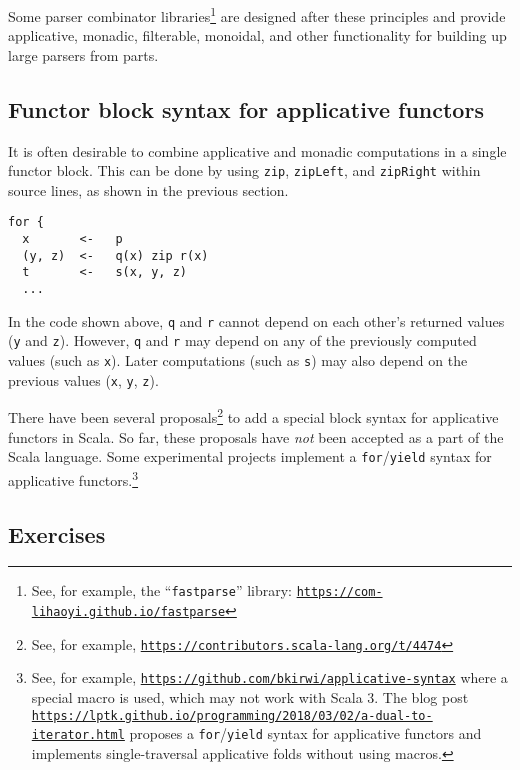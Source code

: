 Some parser combinator libraries\footnote{See, for example, the \textsf{``}\texttt{fastparse}\textsf{''} library: \texttt{\href{https://com-lihaoyi.github.io/fastparse}{https://com-lihaoyi.github.io/fastparse}}}
are designed after these principles and provide applicative, monadic,
filterable, monoidal, and other functionality for building up large
parsers from parts.

\subsection{Functor block syntax for applicative functors}

It is often desirable to combine applicative and monadic computations
in a single functor block. This can be done by using \lstinline!zip!,
\lstinline!zipLeft!, and \lstinline!zipRight! within source lines,
as shown in the previous section.
\begin{lstlisting}
for {
  x       <-   p
  (y, z)  <-   q(x) zip r(x)
  t       <-   s(x, y, z)
  ...
\end{lstlisting}
In the code shown above, \lstinline!q! and \lstinline!r! cannot
depend on each other\textsf{'}s returned values (\lstinline!y! and \lstinline!z!).
However, \lstinline!q! and \lstinline!r! may depend on any of the
previously computed values (such as \lstinline!x!). Later computations
(such as \lstinline!s!) may also depend on the previous values (\lstinline!x!,
\lstinline!y!, \lstinline!z!).

There have been several proposals\footnote{See, for example, \texttt{\href{https://contributors.scala-lang.org/t/4474}{https://contributors.scala-lang.org/t/4474}}}
to add a special block syntax for applicative functors in Scala. So
far, these proposals have \emph{not} been accepted as a part of the
Scala language. Some experimental projects implement a \lstinline!for!/\lstinline!yield!
syntax for applicative functors.\footnote{See, for example, \texttt{\href{https://github.com/bkirwi/applicative-syntax}{https://github.com/bkirwi/applicative-syntax}}
where a special macro is used, which may not work with Scala 3. The
blog post \texttt{\href{https://lptk.github.io/programming/2018/03/02/a-dual-to-iterator.html}{https://lptk.github.io/programming/2018/03/02/a-dual-to-iterator.html}}
proposes a \lstinline!for!/\lstinline!yield! syntax for applicative
functors and implements single-traversal applicative folds without
using macros.}

\subsection{Exercises}

